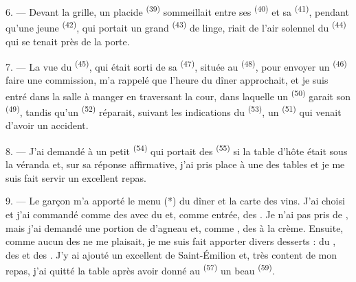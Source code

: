 \VUsaut{4.0mm}
\VUsaut{3.0mm}

6. --- Devant la grille, un placide 
\textsuperscript{(39)} sommeillait entre ses 
\textsuperscript{(40)} et sa  \textsuperscript{(41)},
pendant qu'une jeune  \textsuperscript{(42)}, qui portait
un grand  \textsuperscript{(43)} de linge, riait de l'air
solennel du  \textsuperscript{(44)} qui se tenait près de
la porte.

7. --- La vue du  \textsuperscript{(45)}, qui était sorti de
sa  \textsuperscript{(47)}, située au 
\textsuperscript{(48)}, pour envoyer un 
\textsuperscript{(46)} faire une commission, m'a rappelé que l'heure du dîner
approchait, et je suis entré dans la salle à manger en traversant la cour, dans
laquelle un  \textsuperscript{(50)} garait son
 \textsuperscript{(49)}, tandis qu'un 
\textsuperscript{(52)} réparait, suivant les indications du 
\textsuperscript{(53)}, un  \textsuperscript{(51)}
qui venait d'avoir un accident.

8. --- J'ai demandé à un petit  \textsuperscript{(54)} qui portait
des  \textsuperscript{(55)} si la table d'hôte était
sous la véranda et, sur sa réponse affirmative, j'ai pris place à une des tables
et je me suis fait servir un excellent repas.


\VUsaut{4.0mm}
\VUsaut{3.0mm}

9. --- Le garçon m'a apporté le menu (*) du dîner et la carte des vins. J'ai
choisi et j'ai commandé comme  des  avec
du  et, comme entrée, des . Je
n'ai pas pris de , mais j'ai demandé une portion de
 d'agneau et, comme , des  à la
crème. Ensuite, comme aucun des  ne me plaisait, je me suis
fait apporter divers desserts : du , des  et des
. J'y ai ajouté un excellent  de Saint-Émilion et,
très content de mon repas, j'ai quitté la table après avoir donné au
 \textsuperscript{(57)} un beau 
\textsuperscript{(59)}.

